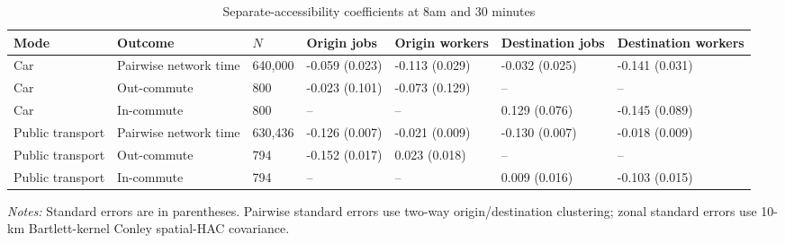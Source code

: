 \begin{table}[htbp]
\centering
\scriptsize
\caption{Separate-accessibility coefficients at 8am and 30 minutes}
\label{tab:separatecoeff}
\begin{tabular}{lllllll}
\toprule
Mode & Outcome & $N$ & Origin jobs & Origin workers & Destination jobs & Destination workers \\
\midrule
Car & Pairwise network time & 640,000 & -0.059 (0.023) & -0.113 (0.029) & -0.032 (0.025) & -0.141 (0.031) \\
Car & Out-commute & 800 & -0.023 (0.101) & -0.073 (0.129) & -- & -- \\
Car & In-commute & 800 & -- & -- & 0.129 (0.076) & -0.145 (0.089) \\
Public transport & Pairwise network time & 630,436 & -0.126 (0.007) & -0.021 (0.009) & -0.130 (0.007) & -0.018 (0.009) \\
Public transport & Out-commute & 794 & -0.152 (0.017) & 0.023 (0.018) & -- & -- \\
Public transport & In-commute & 794 & -- & -- & 0.009 (0.016) & -0.103 (0.015) \\
\bottomrule
\end{tabular}
\par\vspace{2pt}
\begin{minipage}{0.96\linewidth}\footnotesize\textit{Notes:} Standard errors are in parentheses. Pairwise standard errors use two-way origin/destination clustering; zonal standard errors use 10-km Bartlett-kernel Conley spatial-HAC covariance.
\end{minipage}
\end{table}
